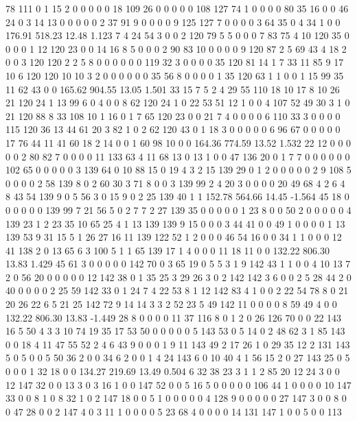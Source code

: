  78 111 0 1 15 2 0 0 0 0 0 18 109 26 0 0 0 0 0 108
 127 74 1 0 0 0 0 80 35 16 0 0 46 24 0 3 14 13 0 0
 0 0 0 2 37 91 9 0 0 0 0 9 125 127 7 0 0 0 0 3
 64 35 0 4 34 1 0 0
176.91 518.23 12.48 1.123
 7 4 24 54 3 0 0 2 120 79 5 5 0 0 0 7 83 75 4 10
 120 35 0 0 0 0 1 12 120 23 0 0 14 16 8 5 0 0 0 2
 90 83 10 0 0 0 0 9 120 87 2 5 69 43 4 18 2 0 0 3
 120 120 2 2 5 8 0 0 0 0 0 0 119 32 3 0 0 0 0 35
 120 81 14 1 7 33 11 85 9 17 10 6 120 120 10 10 3 2 0 0
 0 0 0 0 35 56 8 0 0 0 0 1 35 120 63 1 1 0 0 1
 15 99 35 11 62 43 0 0
165.62 904.55 13.05 1.501
 33 15 7 5 2 4 29 55 110 18 10 17 8 10 26 21 120 24 1 13
 99 6 0 4 0 0 8 62 120 24 1 0 22 53 51 12 1 0 0 4
 107 52 49 30 3 1 0 21 120 88 8 33 108 10 1 16 0 1 7 65
 120 23 0 0 21 7 4 0 0 0 0 6 110 33 3 0 0 0 0 115
 120 36 13 44 61 20 3 82 1 0 2 62 120 43 0 1 18 3 0 0
 0 0 0 6 96 67 0 0 0 0 0 17 76 44 11 41 60 18 2 14
 0 0 1 60 98 10 0 0
164.36 774.59 13.52 1.532
 22 12 0 0 0 0 0 2 80 82 7 0 0 0 0 11 133 63 4 11
 68 13 0 13 1 0 0 47 136 20 0 1 7 7 0 0 0 0 0 0
 102 65 0 0 0 0 0 3 139 64 0 10 88 15 0 19 4 3 2 15
 139 29 0 1 2 0 0 0 0 0 2 9 108 5 0 0 0 0 2 58
 139 8 0 2 60 30 3 71 8 0 0 3 139 99 2 4 20 3 0 0
 0 0 20 49 68 4 2 6 4 8 43 54 139 9 0 5 56 3 0 15
 9 0 2 25 139 40 1 1
152.78 564.66 14.45 -1.564
 45 18 0 0 0 0 0 0 139 99 7 21 56 5 0 2 7 7 2 27
 139 35 0 0 0 0 0 1 23 8 0 0 50 2 0 0 0 0 0 4
 139 23 1 2 23 35 10 65 25 4 1 13 139 139 9 15 0 0 0 3
 44 41 0 0 49 1 0 0 0 0 1 13 139 53 9 31 15 5 1 26
 27 16 11 139 122 52 1 2 0 0 0 46 54 16 0 0 34 1 1 0
 0 0 12 41 138 2 0 13 65 6 3 100 5 1 1 65 139 17 1 4
 0 0 0 11 18 11 0 0
132.22 806.30 13.83 1.429
 45 61 3 0 0 0 0 0 142 70 0 3 65 19 0 5 5 3 1 9
 142 43 1 1 0 0 4 10 13 7 2 0 56 20 0 0 0 0 0 12
 142 38 0 1 35 25 3 29 26 3 0 2 142 142 3 6 0 0 2 5
 28 44 2 0 40 0 0 0 0 2 25 59 142 33 0 1 24 7 4 22
 53 8 1 12 142 83 4 1 0 0 2 22 54 78 8 0 21 20 26 22
 6 5 21 25 142 72 9 14 14 3 3 2 52 23 5 49 142 11 0 0
 0 0 8 59 49 4 0 0
132.22 806.30 13.83 -1.449
 28 8 0 0 0 0 11 37 116 8 0 1 2 0 26 126 70 0 0 22
 143 16 5 50 4 3 3 10 74 19 35 17 53 50 0 0 0 0 0 5
 143 53 0 5 14 0 2 48 62 3 1 85 143 0 0 18 4 11 47 55
 52 2 4 6 43 9 0 0 0 1 9 11 143 49 2 17 26 1 0 29
 35 12 2 131 143 5 0 5 0 0 5 50 36 2 0 0 34 6 2 0
 0 1 4 24 143 6 0 10 40 4 1 56 15 2 0 27 143 25 0 5
 0 0 0 1 32 18 0 0
134.27 219.69 13.49 0.504
 6 32 38 23 3 1 1 2 85 20 12 24 3 0 0 12 147 32 0 0
 13 3 0 3 16 1 0 0 147 52 0 0 5 16 5 0 0 0 0 0
 106 44 1 0 0 0 0 10 147 33 0 0 8 1 0 8 32 1 0 2
 147 18 0 0 5 1 0 0 0 0 0 4 128 9 0 0 0 0 0 27
 147 3 0 0 8 0 0 47 28 0 0 2 147 4 0 3 11 1 0 0
 0 0 5 23 68 4 0 0 0 0 14 131 147 1 0 0 5 0 0 113
